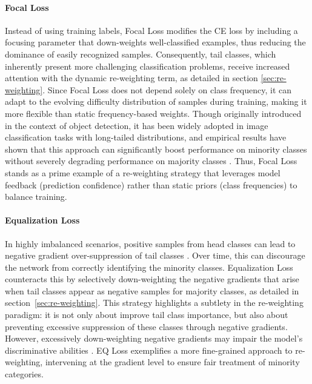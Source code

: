 \paragraph{Focal Loss}
Instead of using training labels, Focal Loss \cite{lin2018focallossdenseobject} modifies the CE loss by including a focusing parameter that down-weights well-classified examples, thus reducing the dominance of easily recognized samples. Consequently, tail classes, which inherently present more challenging classification problems, receive increased attention with the dynamic re-weighting term, as detailed in section \ref{sec:re-weighting}. Since Focal Loss does not depend solely on class frequency, it can adapt to the evolving difficulty distribution of samples during training, making it more flexible than static frequency-based weights. Though originally introduced in the context of object detection, it has been widely adopted in image classification tasks with long-tailed distributions, and empirical results have shown that this approach can significantly boost performance on minority classes without severely degrading performance on majority classes \cite{lin2018focallossdenseobject,zhang2023deep}. Thus, Focal Loss stands as a prime example of a re-weighting strategy that leverages model feedback (prediction confidence) rather than static priors (class frequencies) to balance training.

\paragraph{Equalization Loss}
In highly imbalanced scenarios, positive samples from head classes can lead to negative gradient over-suppression of tail classes \cite{zhang2023deep}. Over time, this can discourage the network from correctly identifying the minority classes. Equalization Loss \cite{tan2020equalizationlosslongtailedobject} counteracts this by selectively down-weighting the negative gradients that arise when tail classes appear as negative samples for majority classes, as detailed in section~\ref{sec:re-weighting}. This strategy highlights a subtlety in the re-weighting paradigm: it is not only about improve tail class importance, but also about preventing excessive suppression of these classes through negative gradients. However, excessively down-weighting negative gradients may impair the model's discriminative abilities \cite{zhang2023deep}. EQ Loss exemplifies a more fine-grained approach to re-weighting, intervening at the gradient level to ensure fair treatment of minority categories. 

